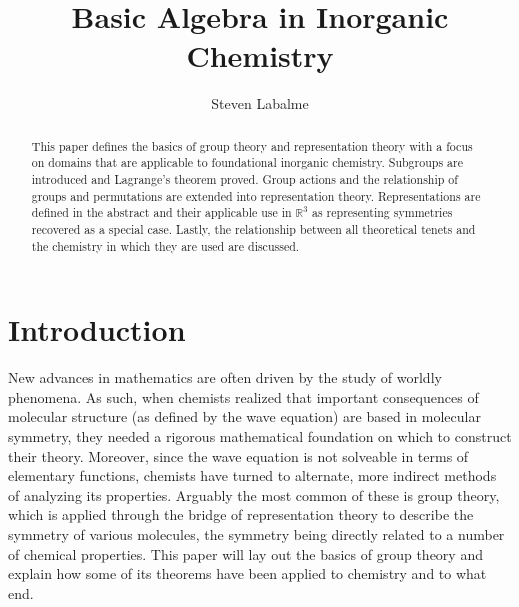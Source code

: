 \documentclass[openany, amssymb, psamsfonts]{amsart}
\title{Basic Algebra in Inorganic Chemistry}
\author{Steven Labalme}
\theoremstyle{definition}
\numberwithin{equation}{section}
\begin{document}
\begin{abstract}
    This paper defines the basics of group theory and representation theory with a focus on domains that are applicable to foundational inorganic chemistry. Subgroups are introduced and Lagrange's theorem proved. Group actions and the relationship of groups and permutations are extended into representation theory. Representations are defined in the abstract and their applicable use in $\mathbb{R}^3$ as representing symmetries recovered as a special case. Lastly, the relationship between all theoretical tenets and the chemistry in which they are used are discussed.
\end{abstract}



\maketitle
\tableofcontents



\section{Introduction}
New advances in mathematics are often driven by the study of worldly phenomena. As such, when chemists realized that important consequences of molecular structure (as defined by the wave equation) are based in molecular symmetry, they needed a rigorous mathematical foundation on which to construct their theory. Moreover, since the wave equation is not solveable in terms of elementary functions, chemists have turned to alternate, more indirect methods of analyzing its properties. Arguably the most common of these is group theory, which is applied through the bridge of representation theory to describe the symmetry of various molecules, the symmetry being directly related to a number of chemical properties. This paper will lay out the basics of group theory and explain how some of its theorems have been applied to chemistry and to what end.
\end{document}

